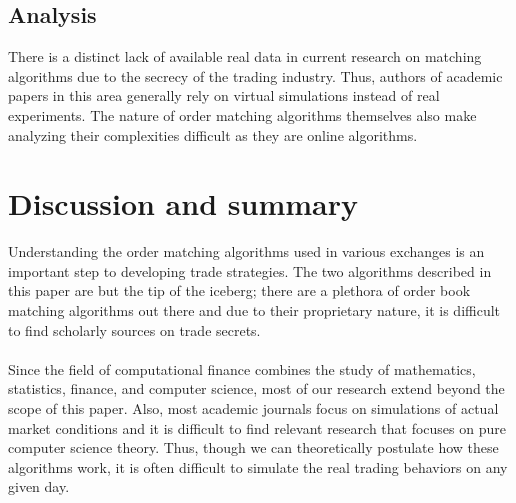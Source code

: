 \documentclass{article}
\begin{document}
\subsection{Analysis}
There is a distinct lack of available real data in current research on matching algorithms due to the secrecy of the trading industry. Thus, authors of academic papers in this area generally rely on virtual simulations instead of real experiments. The nature of order matching algorithms themselves also make analyzing their complexities difficult as they are online algorithms.

\section{Discussion and summary}
Understanding the order matching algorithms used in various exchanges is an important step to developing trade strategies. The two algorithms described in this paper are but the tip of the iceberg; there are a plethora of order book matching algorithms out there and due to their proprietary nature, it is difficult to find scholarly sources on trade secrets.\\\\
Since the field of computational finance combines the study of mathematics, statistics, finance, and computer science, most of our research extend beyond the scope of this paper. Also, most academic journals focus on simulations of actual market conditions  and it is difficult to find relevant research that focuses on pure computer science theory. Thus, though we can theoretically postulate how these algorithms work, it is often difficult to simulate the real trading behaviors on any given day.\\\\

\newpage


                
\end{document}

